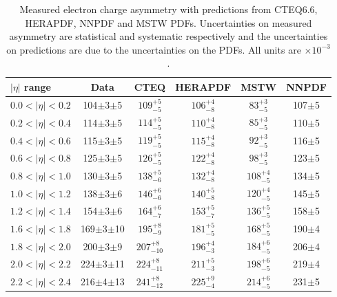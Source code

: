 \begin{table}[htbp]
\begin{center}
\begin{tabular}{lccccc}
\toprule
$|\eta|$ range  & Data & CTEQ & HERAPDF & MSTW & NNPDF \\ \midrule
  $0.0<|\eta|<0.2$ &104$\pm$3$\pm$5 &$109^{+5}_{-5}$ &$106^{+4}_{-8}$ & $83^{+3}_{-5}$& 107$\pm$5\\
  $0.2<|\eta|<0.4$ &114$\pm$3$\pm$5 &$114^{+5}_{-5}$ &$110^{+4}_{-8}$ & $85^{+3}_{-5}$& 110$\pm$5\\
  $0.4<|\eta|<0.6$ &115$\pm$3$\pm$5 &$119^{+5}_{-5}$ &$115^{+4}_{-8}$ & $92^{+3}_{-5}$& 116$\pm$5\\
  $0.6<|\eta|<0.8$ &125$\pm$3$\pm$5 &$126^{+5}_{-5}$ &$122^{+4}_{-8}$ & $98^{+3}_{-5}$& 123$\pm$5\\
  $0.8<|\eta|<1.0$ &130$\pm$3$\pm$5 &$138^{+5}_{-6}$ &$132^{+4}_{-8}$ & $108^{+4}_{-5}$& 134$\pm$5\\
  $1.0<|\eta|<1.2$ &138$\pm$3$\pm$6 &$146^{+6}_{-6}$ &$140^{+5}_{-8}$ & $120^{+4}_{-5}$&145$\pm$5 \\
  $1.2<|\eta|<1.4$ &154$\pm$3$\pm$6 &$164^{+6}_{-7}$ &$153^{+5}_{-7}$ & $136^{+5}_{-5}$&158$\pm$5 \\
  $1.6<|\eta|<1.8$ &169$\pm$3$\pm$10 &$195^{+8}_{-9}$ &$181^{+5}_{-5}$ & $168^{+5}_{-5}$&190$\pm$4 \\
  $1.8<|\eta|<2.0$ &200$\pm$3$\pm$9 &$207^{+8}_{-10}$ &$196^{+4}_{-3}$ & $184^{+6}_{-5}$&206$\pm$4 \\
  $2.0<|\eta|<2.2$ &224$\pm$3$\pm$11 &$224^{+8}_{-11}$ &$211^{+5}_{-3}$ & $198^{+6}_{-5}$&219$\pm$4 \\
  $2.2<|\eta|<2.4$ &216$\pm$4$\pm$13 &$241^{+8}_{-12}$ &$225^{+9}_{-4}$ & $214^{+6}_{-5}$&231$\pm$5 \\
\bottomrule
\end{tabular}
\caption[Measured electron charge asymmetry with predictions from CTEQ6.6,
HERAPDF, NNPDF and MSTW PDFs.]{Measured electron charge asymmetry with
predictions from CTEQ6.6, HERAPDF, NNPDF and MSTW PDFs. Uncertainties on
measured asymmetry are statistical and systematic respectively and the
uncertainties on predictions are due to the uncertainties on the PDFs. All units
are $\times 10^{-3}$\cite{bendavid2011electron}.}
\label{tab:updatedresults}
\end{center}
\end{table}

